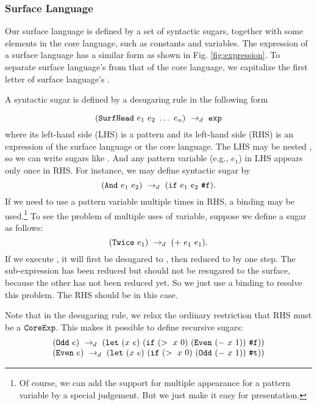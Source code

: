 
\subsubsection{Surface Language}

Our surface language is defined by a set of syntactic sugars, together with some elements in the core language, such as constants and variables. The expression of a surface language has a similar form as shown in Fig.  \ref{fig:expression}. To separate surface language's  from that of the core language, we capitalize the first letter of surface language's .

A syntactic sugar  is defined by a desugaring rule in the following form

\[
\drule{(\m{SurfHead}~e_1~e_2~\ldots~e_n)}{\m{exp}} %
\]
where its left-hand side (LHS) is a pattern and its left-hand side (RHS) is an expression of the surface language or the core language. The LHS may be nested , so we can write sugars like . And any pattern variable (e.g., $e_1$) in LHS appears only once in RHS. For instance, we may define syntactic sugar  by
\[
(\mbox{\tt And}~e_1~e_2) ~\rightarrow_d~ (\mbox{\tt if}~e_1~e_2~\mbox{\tt \#f}).
\]
If we need to use a pattern variable multiple times in RHS, a  binding may be used.\footnote{Of course, we can add the support for multiple appearance for a pattern variable by a special judgement. But we just make it easy for presentation.} To see the problem of multiple uses of variable, suppose we define a sugar as follows:
\[
(\mbox{\tt Twice}~e_1) ~\rightarrow_d~ (+~e_1~e_1).
\]
If we execute , it will first be desugared to , then reduced to  by one step. The sub-expression  has been reduced but should not be resugared to the surface, because the other  has not been reduced yet.
So we just use a  binding to resolve this problem. The RHS should be  in this case.


Note that in the desugaring rule, we relax the ordinary restriction that RHS must be a $\mbox{\tt CoreExp}$. This makes it possible to define recursive sugars:
\[
\begin{array}{l}
(\mbox{\tt Odd}~e) ~\rightarrow_d~ (\mbox{\tt let}~(x~e)~(\mbox{\tt if}~(>~x~0)~(\mbox{\tt Even}~(-~x~1))~\mbox{\tt \#f}))\\
(\mbox{\tt Even}~e) ~\rightarrow_d~ (\mbox{\tt let}~(x~e)~(\mbox{\tt if}~(>~x~0)~(\mbox{\tt Odd}~(-~x~1))~\mbox{\tt \#t}))
\end{array}
\]

